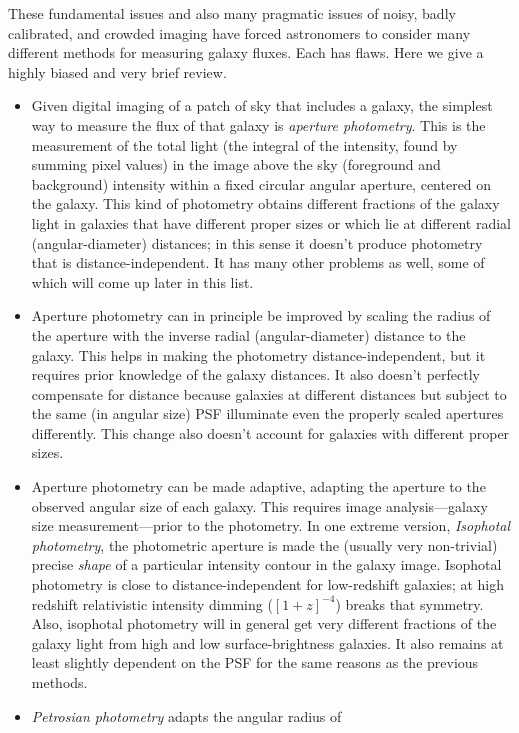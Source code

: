 \documentclass[12pt,preprint,pdftex]{aastex}
\begin{document}
These fundamental issues and also many pragmatic issues of noisy,
badly calibrated, and crowded imaging have forced astronomers to
consider many different methods for measuring galaxy fluxes.  Each has
flaws.  Here we give a highly biased and very brief review.
\begin{itemize}
\item Given digital imaging of a patch of sky that includes a galaxy,
  the simplest way to measure the flux of that galaxy is
  \emph{aperture photometry}.  This is the measurement of the total
  light (the integral of the intensity, found by summing pixel values)
  in the image above the sky (foreground and background) intensity
  within a fixed circular angular aperture, centered on the galaxy.
  This kind of photometry obtains different fractions of the galaxy
  light in galaxies that have different proper sizes or which lie at
  different radial (angular-diameter) distances; in this sense it
  doesn't produce photometry that is distance-independent.  It has
  many other problems as well, some of which will come up later in
  this list.
\item Aperture photometry can in principle be improved by scaling the
  radius of the aperture with the inverse radial (angular-diameter)
  distance to the galaxy.  This helps in making the photometry
  distance-independent, but it requires prior knowledge of the galaxy
  distances.  It also doesn't perfectly compensate for distance
  because galaxies at different distances but subject to the same (in
  angular size) PSF illuminate even the properly scaled apertures
  differently.  This change also doesn't account for galaxies with
  different proper sizes.
\item Aperture photometry can be made adaptive, adapting the aperture
  to the observed angular size of each galaxy.  This requires image
  analysis---galaxy size measurement---prior to the photometry.  In
  one extreme version, \emph{Isophotal photometry}, the photometric
  aperture is made the (usually very non-trivial) precise \emph{shape}
  of a particular intensity contour in the galaxy image.  Isophotal
  photometry is close to distance-independent for low-redshift
  galaxies; at high redshift relativistic intensity dimming
  ($[1+z]^{-4}$) breaks that symmetry.  Also, isophotal photometry
  will in general get very different fractions of the galaxy light
  from high and low surface-brightness galaxies.  It also remains at
  least slightly dependent on the PSF for the same reasons as the
  previous methods.
\item \emph{Petrosian photometry} \citep{petrosian} adapts the angular radius of

\end{itemize}
\end{document}
